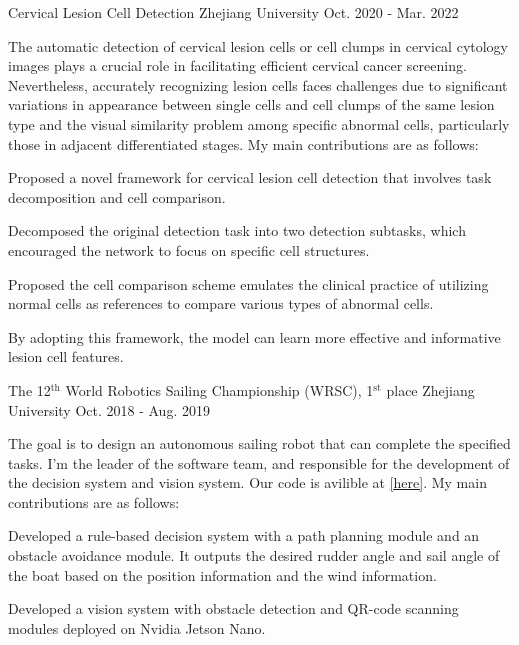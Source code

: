 \begin{cventries}
	\cventry
	{} %
	{Cervical Lesion Cell Detection} %
	{Zhejiang University} %
	{Oct. 2020 - Mar. 2022} %
	{
		\quad The automatic detection of cervical lesion cells or cell clumps in cervical cytology images plays a crucial role in facilitating efficient cervical cancer screening. Nevertheless, accurately recognizing lesion cells faces challenges due to significant variations in appearance between single cells and cell clumps of the same lesion type and the visual similarity problem among specific abnormal cells, particularly those in adjacent differentiated stages. \newline
		My main contributions are as follows: \newline
		\vspace{3.5mm}
		\begin{cvitems} %
			\item{Proposed a novel framework for cervical lesion cell detection that involves task decomposition and cell comparison.}
			\item{Decomposed the original detection task into two detection subtasks, which encouraged the network to focus on specific cell structures.}
			\item{Proposed the cell comparison scheme emulates the clinical practice of utilizing normal cells as references to compare various types of abnormal cells.}
			\item{By adopting this framework, the model can learn more effective and informative lesion cell features.}
		\end{cvitems}
		\vspace{3.5mm}
	}

	\cventry
	{} %
	{The 12$^\text{th}$ World Robotics Sailing Championship (WRSC), 1$^\text{st}$ place} %
	{Zhejiang University} %
	{Oct. 2018 - Aug. 2019} %
	{
		\quad The goal is to design an autonomous sailing robot that can complete the specified tasks. I'm the leader of the software team, and responsible for the development of the decision system and vision system. Our code is avilible at \href{https://github.com/ZMART-Sailing/sailing_robot}{\textcolor{link}{[here]}}.\newline
		My main contributions are as follows: \newline
		\vspace{3.5mm}
		\begin{cvitems} %
			\item{Developed a rule-based decision system with a path planning module and an obstacle avoidance module. It outputs the desired rudder angle and sail angle of the boat based on the position information and the wind information.}
			\item{Developed a vision system with obstacle detection and QR-code scanning modules deployed on Nvidia Jetson Nano.}
		\end{cvitems}
		\vspace{3.5mm}
	}


\end{cventries}
